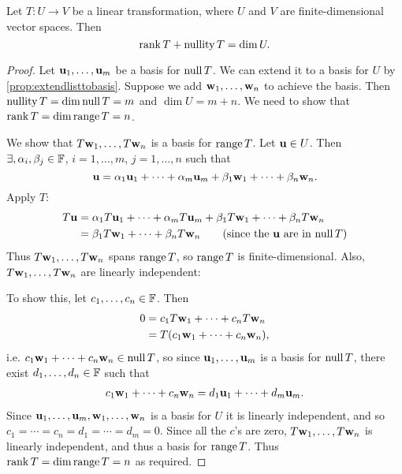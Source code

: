 \documentclass{article}
\begin{document}
\begin{theorem}
Let $T:U \to V$ be a linear transformation, where $U$ and $V$ are finite-dimensional vector spaces. Then  
\begin{equation*}
\operatorname{rank} T + \operatorname{nullity}  T = \dim U.
\end{equation*}
\end{theorem}
\begin{proof}
Let ${\mathbf{u}}_1, \ldots, {\mathbf{u}}_m$ be a basis for $\operatorname{null} T$. We can extend it to a basis for $U$ by \cref{prop:extendlisttobasis}. Suppose we add ${\mathbf{w}}_1, \ldots, {\mathbf{w}}_n$ to achieve the basis. Then $\operatorname{nullity} T = \dim \operatorname{null} T = m$ and $\dim U = m+n$. We need to show that $\operatorname{rank} T = \dim \operatorname{range} T = n$.

We show that $T{\mathbf{w}}_1, \ldots, T{\mathbf{w}}_n$ is a basis for $\operatorname{range} T$. Let ${\mathbf{u}} \in U$. Then $\exists, \alpha_i, \beta_j \in {\mathbb{F}}$, $i=1,\dots,m$, $j=1,\dots,n$ such that
\begin{equation*}
    {\mathbf{u}} = \alpha_1 {\mathbf{u}}_1 + \cdots + \alpha_m {\mathbf{u}}_m + \beta_ 1{\mathbf{w}}_1 + \cdots + \beta_n {\mathbf{w}}_n .
\end{equation*}
Apply $T$:
\begin{align*}
    T{\mathbf{u}} & = \alpha_1 T {\mathbf{u}}_1 + \cdots + \alpha_m T{\mathbf{u}}_m + \beta_ 1 T{\mathbf{w}}_1 + \cdots + \beta_n T{\mathbf{w}}_n \\
    & =  \beta_ 1 T{\mathbf{w}}_1 + \cdots + \beta_n T{\mathbf{w}}_n  \qquad \text{(since the ${\mathbf{u}}$ are in $\operatorname{null} T$)}
\end{align*}
Thus $T{\mathbf{w}}_1, \ldots, T{\mathbf{w}}_n$ spans $\operatorname{range} T$, so $\operatorname{range} T$ is finite-dimensional. Also, $T{\mathbf{w}}_1, \ldots, T{\mathbf{w}}_n$ are linearly independent:

To show this, let $c_1,\ldots, c_n \in {\mathbb{F}}$. Then
\begin{align*}
    0 &= c_ 1 T{\mathbf{w}}_1 + \cdots + c_n T{\mathbf{w}}_n \\
    &= T(c_1 {\mathbf{w}}_1 + \cdots + c_n {\mathbf{w}}_n), 
\end{align*}
i.e. $c_1 {\mathbf{w}}_1 + \cdots + c_n {\mathbf{w}}_n \in \operatorname{null} T$, so since ${\mathbf{u}}_1, \ldots, {\mathbf{u}}_m$ is a basis for $\operatorname{null} T$, there exist $d_1,\ldots, d_n \in {\mathbb{F}}$ such that
\begin{align*}
    c_1 {\mathbf{w}}_1 + \cdots + c_n {\mathbf{w}}_n = d_1 {\mathbf{u}}_1 + \cdots + d_m {\mathbf{u}}_m.
\end{align*}
Since ${\mathbf{u}}_1, \ldots, {\mathbf{u}}_m,{\mathbf{w}}_1, \ldots, {\mathbf{w}}_n$ is a basis for $U$ it is linearly independent, and so $c_1 = \cdots = c_n = d_1 = \cdots =d_m = 0$. Since all the $c$'s are zero, $T{\mathbf{w}}_1, \ldots, T{\mathbf{w}}_n$ is linearly independent, and thus a basis for $\operatorname{range} T$. Thus $\operatorname{rank} T = \dim \operatorname{range} T = n$ as required. 
\end{proof}
\end{document}
